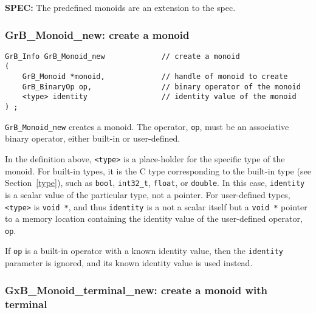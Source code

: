 \documentclass[12pt]{article}
\begin{document}
\begin{spec}
{\bf SPEC:} The predefined monoids are an extension to the spec.
\end{spec}

\subsubsection{{\sf GrB\_Monoid\_new:} create a monoid}
\label{monoid_new}

\begin{mdframed}[userdefinedwidth=6in]
{\footnotesize
\begin{verbatim}
GrB_Info GrB_Monoid_new             // create a monoid
(
    GrB_Monoid *monoid,             // handle of monoid to create
    GrB_BinaryOp op,                // binary operator of the monoid
    <type> identity                 // identity value of the monoid
) ;
\end{verbatim}
} \end{mdframed}

\verb'GrB_Monoid_new' creates a monoid.  The operator, \verb'op', must be an
associative binary operator, either built-in or user-defined.

In the definition above, \verb'<type>' is a place-holder for the specific type
of the monoid.  For built-in types, it is the C type corresponding to the
built-in type (see Section~\ref{type}), such as \verb'bool', \verb'int32_t',
\verb'float', or \verb'double'.  In this case, \verb'identity' is a
scalar value of the particular type, not a pointer.  For
user-defined types, \verb'<type>' is \verb'void *', and thus \verb'identity' is
a not a scalar itself but a \verb'void *' pointer to a memory location
containing the identity value of the user-defined operator, \verb'op'.

If \verb'op' is a built-in operator with a known identity value, then the
\verb'identity' parameter is ignored, and its known identity value is used
instead.

\subsubsection{{\sf GxB\_Monoid\_terminal\_new:} create a monoid with terminal}
\label{monoid_terminal_new}
\end{document}
